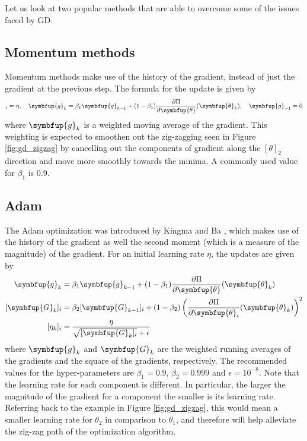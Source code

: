 \documentclass[11pt]{extarticle}
\theoremstyle{definition}
\newcommand{\btheta}{\symbfup{\theta}}
\newcommand{\g}{\symbfup{g}}
\newcommand{\G}{\symbfup{G}}
\newcommand{\df}[2]{\frac{\partial #1}{\partial #2}}
\begin{document}
Let us look at two popular methods that are able to overcome some of the issues faced by GD.

\subsection*{Momentum methods}
Momentum methods make use of the history of the gradient, instead of just the gradient at the previous step. The formula for the update is given by
\begin{align*}
[\eta_k ]_i = \eta, \quad \g_k = \beta_1 \g_{k-1} + (1-\beta_1) \df{\Pi}{\btheta}(\btheta_k), \quad \g_{-1} = 0
\end{align*}
where $\g_k$ is a weighted moving average of the gradient. This weighting is expected to smoothen out the zig-zagging seen in Figure \ref{fig:gd_zigzag} by cancelling out the components of gradient along the $[\theta]_2$ direction and move more smoothly towards the minima. A commonly used value for $\beta_1$ is 0.9. 

\subsection*{Adam}
The Adam optimization was introduced by Kingma and Ba \cite{kingma2017adam}, which makes use of the history of the gradient as well the second moment (which is a measure of the magnitude) of the gradient. For an initial learning rate $\eta$, the updates are given by
\begin{equation}
\begin{aligned}
\g_k &= \beta_1 \g_{k-1} +  (1-\beta_1) \df{\Pi}{\btheta}(\btheta_k) \\
[\G_k]_i &= \beta_2[\G_{k-1}]_i + (1-\beta_2) \left(\df{\Pi}{\btheta_i}(\btheta_k)\right)^2\\
[\eta_k ]_i &=\frac{\eta}{\sqrt{[\G_k]_i} + \epsilon} 
\end{aligned}
\end{equation}
where $\g_k$ and $\G_k$ are the weighted running averages of the gradients and the square of the gradients, respectively. The recommended values for the hyper-parameters are $\beta_1 = 0.9$, $\beta_2 = 0.999$ and $\epsilon=10^{-8}$. Note that the learning rate for each component is different. In particular, the larger the magnitude of the gradient for a component the smaller is its learning rate. Referring back to the example in Figure \ref{fig:gd_zigzag}, this would mean a smaller learning rate for $\theta_2$ in comparison to $\theta_1$, and therefore will help alleviate the zig-zag path of the optimization algorithm. 
\end{document}
